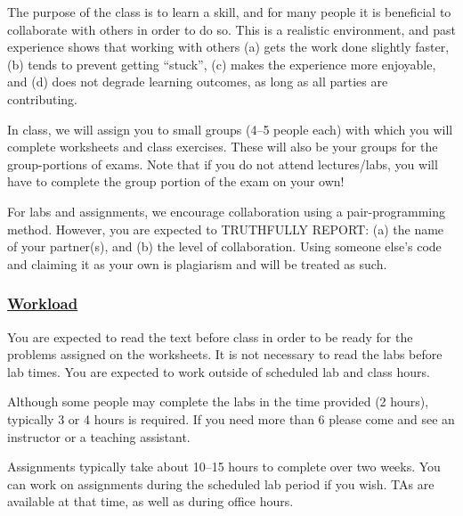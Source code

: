 \documentclass[12pt]{article}
\renewcommand{\section}[1]{\vspace{0pt}\subsubsection*{\underline{\large #1}}\vspace{-10pt}}
\begin{document}
The purpose of the class is to learn a skill, and for many people it is beneficial
to collaborate with others in order to do so. This is a realistic environment, and past experience shows that working
with others (a) gets the work done slightly faster, (b) tends to prevent getting ``stuck'',
(c) makes the experience more enjoyable, and (d) does not degrade learning outcomes, as
long as all parties are contributing.  

In class, we will assign you to small groups (4--5 people each) with which you will complete worksheets and class exercises. These will also be your groups for the group-portions of exams. Note that if you do not attend lectures/labs, you will have to complete the group portion of the exam on your own!

For labs and assignments, we encourage collaboration using a pair-programming method. However, you are expected to TRUTHFULLY REPORT: (a) the name of 
your partner(s), and (b) the level of collaboration. Using someone else's code and claiming it as your own is plagiarism and will be treated as such. 
 
\section{Workload}

You are expected to read the text before class in order to be ready for the problems assigned on the worksheets. 
It is not necessary to read the labs before lab times. You are expected to work outside of scheduled lab and class hours. 

Although some people
may complete the labs in the time provided (2 hours), typically 3 or 4 hours is required.
If you need more than 6 please come and see an instructor or a teaching assistant.
 
Assignments typically take about 10--15 hours to complete over two weeks. You can work on assignments during the scheduled lab period if you wish. TAs are available at that time, as well as during office hours.
\end{document}
